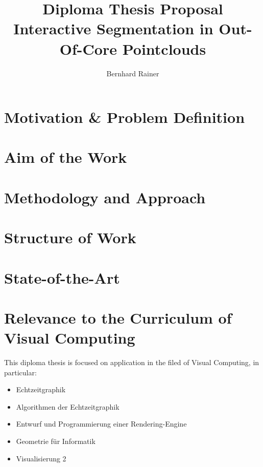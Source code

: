 \documentclass[]{article}
\title{\textbf{Diploma Thesis Proposal}\\
	\Large Interactive Segmentation in Out-Of-Core Pointclouds}
\author{Bernhard Rainer}
\begin{document}
\maketitle

\section{Motivation & Problem Definition}

\section{Aim of the Work}

\section{Methodology and Approach}

\section{Structure of Work}

\section{State-of-the-Art}

\section{Relevance to the Curriculum of Visual Computing}

This diploma thesis is focused on application in the filed of Visual Computing, in particular: 
\begin{itemize}
	\item Echtzeitgraphik
	\item Algorithmen der Echtzeitgraphik
	\item Entwurf und Programmierung einer Rendering-Engine
	\item Geometrie für Informatik
	\item Visualisierung 2
\end{itemize}
\end{document}
